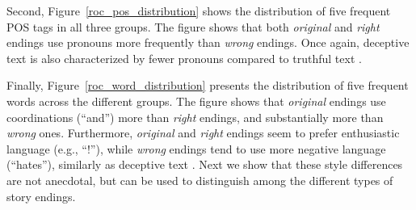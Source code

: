 \documentclass[11pt,a4paper]{article}
\newcommand{\figref}[1]{Figure~\ref{#1}}
\begin{document}
Second, \figref{roc_pos_distribution} shows the distribution of five frequent POS tags in all three groups. 
The figure shows that both {\it original} and {\it right} endings use pronouns more frequently than {\it wrong} endings.
Once again, deceptive text is also characterized by fewer pronouns compared to truthful text \cite{Newman:2003}.

Finally, \figref{roc_word_distribution} presents the distribution of five frequent words across the different groups. 
The figure shows that {\it original} endings use coordinations (``and'') more than  {\it right} endings, and substantially more than {\it wrong} ones. %
Furthermore, {\it original} and {\it right} endings seem to prefer enthusiastic language (e.g., ``!''), while {\it wrong} endings tend to use more negative language (``hates''), similarly as deceptive text \cite{Newman:2003}.
Next we show that these style differences are not anecdotal, but can
be used to distinguish among the different types of story endings.
\end{document}
